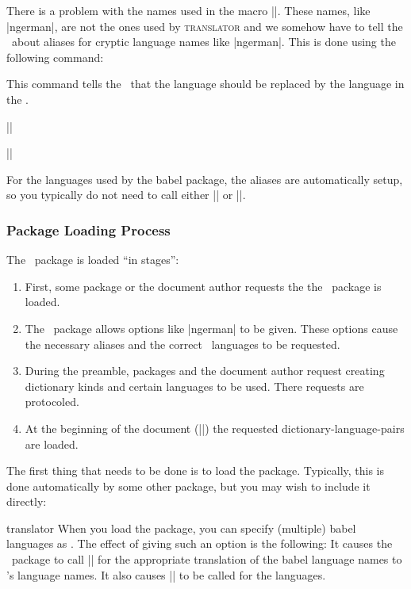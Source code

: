 There is a problem with the names used in the macro |\languagename|. These names, like |ngerman|, are not the ones used by \textsc{translator} and we somehow have to tell the \translatorname\ about aliases for cryptic language names like |ngerman|. This is done using the following command:

\begin{command}{\languagealias{}}
  This command tells the \translatorname\ that the language  should be replaced by the language in the .

  \example
  ||

  \example
  ||
\end{command}

For the languages used by the babel package, the aliases are automatically setup, so you typically do not need to call either |\languagepath| or |\languagealias|.

\subsubsection{Package Loading Process}

The \translatorname\ package is loaded ``in stages'':
\begin{enumerate}
\item
  First, some package or the document author requests the the \translatorname\ package is loaded.
\item
  The \translatorname\ package allows options like |ngerman| to be given. These options cause the necessary aliases and the correct \translatorname\ languages to be requested.
\item
  During the preamble, packages and the document author request creating dictionary kinds and certain languages to be used. There requests are protocoled.
\item
  At the beginning of the document (||) the requested dictionary-language-pairs are loaded.
\end{enumerate}

The first thing that needs to be done is to load the package. Typically, this is done automatically by some other package, but you may wish to include it directly:

\begin{package}{{translator}}
  When you load the package, you can specify (multiple) babel languages as . The effect of giving such an option is the following: It causes the \translatorname\ package to call |\uselanguage| for the appropriate translation of the babel language names to \translatorname's language names. It also causes |\languagealias| to be called for the languages. 
\end{package}
